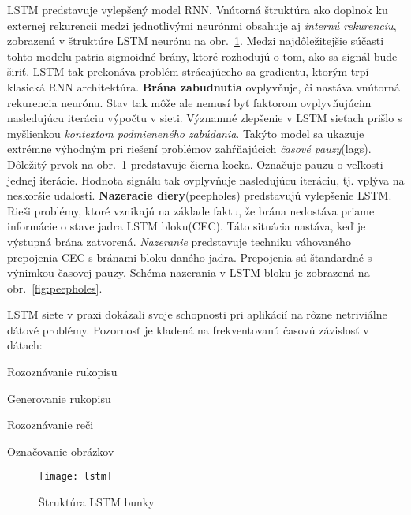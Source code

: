 LSTM predstavuje vylepšený model RNN. Vnútorná štruktúra ako doplnok ku externej rekurencii medzi jednotlivými neurónmi obsahuje aj \textit{internú rekurenciu}, zobrazenú v štruktúre LSTM neurónu na obr.~\ref{fig:lstm}. Medzi najdôležitejšie súčasti tohto modelu patria sigmoidné brány, ktoré rozhodujú o tom, ako sa signál bude širiť. LSTM tak prekonáva problém strácajúceho sa gradientu, ktorým trpí klasická RNN architektúra.
\newline
\textbf{Brána zabudnutia} ovplyvňuje, či nastáva vnútorná rekurencia neurónu. Stav tak môže ale nemusí byť faktorom ovplyvňujúcim nasledujúcu iteráciu výpočtu v sieti. Významné zlepšenie v LSTM sieťach prišlo s myšlienkou \textit{kontextom podmieneného zabúdania}. Takýto model sa ukazuje extrémne výhodným pri riešení problémov zahŕňajúcich \textit{časové pauzy}(lags).
 Dôležitý prvok  na obr.~\ref{fig:lstm} predstavuje čierna kocka. Označuje pauzu o veľkosti jednej iterácie. Hodnota signálu tak ovplyvňuje nasledujúcu iteráciu, tj. vplýva na neskoršie udalosti.
\newline
\noindent
\textbf{Nazeracie diery}(peepholes) predstavujú vylepšenie LSTM. Rieši problémy, ktoré vznikajú na základe faktu, že brána nedostáva priame informácie o stave jadra LSTM bloku(CEC). Táto situácia nastáva, keď je výstupná brána zatvorená. \textit{Nazeranie} predstavuje techniku váhovaného prepojenia CEC s bránami bloku daného jadra. Prepojenia sú štandardné s výnimkou časovej pauzy. Schéma nazerania v LSTM bloku je zobrazená na obr.~\ref{fig:peepholes}.

LSTM siete v praxi dokázali svoje schopnosti pri aplikácií na rôzne netriviálne dátové problémy. Pozornosť je kladená na frekventovanú časovú závislosť v dátach:
\begin{my_itemize}
	\item{Rozoznávanie rukopisu}
	\item{Generovanie rukopisu}
	\item{Rozoznávanie reči}
	\item{Označovanie obrázkov}
\end{my_itemize}

\begin{figure}[H]
\begin{center}
\texttt{[image: lstm]}\end{center}
\caption[lstm]{Štruktúra LSTM bunky}\label{fig:lstm}
\end{figure}

